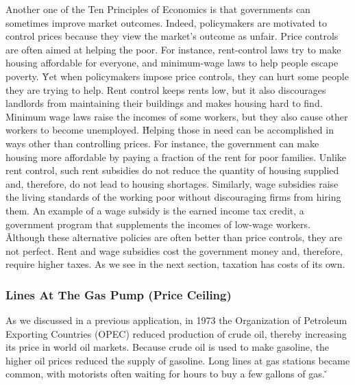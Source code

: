 Another one of the Ten Principles of Economics is that governments can sometimes improve market outcomes. Indeed,
policymakers are motivated to control prices because they view the market's outcome as unfair. Price controls are
often aimed at helping the poor. For instance, rent-control laws try to make housing affordable for everyone, and
minimum-wage laws to help people escape poverty. \v

Yet when policymakers impose price controls, they can hurt some people they are trying to help. Rent control keeps
rents low, but it also discourages landlords from maintaining their buildings and makes housing hard to find. Minimum
wage laws raise the incomes of some workers, but they also cause other workers to become unemployed. \v

Helping those in need can be accomplished in ways other than controlling prices. For instance, the government can
make housing more affordable by paying a fraction of the rent for poor families. Unlike rent control, such rent
subsidies do not reduce the quantity of housing supplied and, therefore, do not lead to housing shortages. Similarly,
wage subsidies raise the living standards of the working poor without discouraging firms from hiring them. An example
of a wage subsidy is the earned income tax credit, a government program that supplements the incomes of low-wage
workers. \v

Although these alternative policies are often better than price controls, they are not perfect. Rent and wage
subsidies cost the government money and, therefore, require higher taxes. As we see in the next section, taxation has
costs of its own.

\subsubsection*{Lines At The Gas Pump (Price Ceiling)}

As we discussed in a previous application, in 1973 the Organization of Petroleum Exporting Countries (OPEC) reduced
production of crude oil, thereby increasing its price in world oil markets. Because crude oil is used to make
gasoline, the higher oil prices reduced the supply of gasoline. Long lines at gas stations became common, with
motorists often waiting for hours to buy a few gallons of gas. \v

